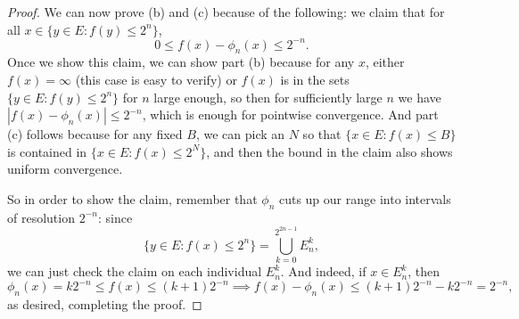 \begin{proof}
We can now prove (b) and (c) because of the following: we claim that for all $x \in \{y \in E: f(y) \le 2^n\}$,
\[
    0  \le f(x) - \phi_n(x) \le 2^{-n}. 
\]
Once we show this claim, we can show part (b) because for any $x$, either $f(x) = \infty$ (this case is easy to verify) or $f(x)$ is in the sets $\{y \in E: f(y) \le 2^n\}$ for $n$ large enough, so then for sufficiently large $n$ we have $|f(x) - \phi_n(x)| \le 2^{-n}$, which is enough for pointwise convergence. And part (c) follows because for any fixed $B$, we can pick an $N$ so that $\{x \in E: f(x) \le B\}$ is contained in $\{x \in E: f(x) \le 2^N\}$, and then the bound in the claim also shows uniform convergence. 

So in order to show the claim, remember that $\phi_n$ cuts up our range into intervals of resolution $2^{-n}$: since
\[
    \{y \in E: f(x) \le 2^n\} = \bigcup_{k=0}^{2^{2n-1}} E_n^k,
\]
we can just check the claim on each individual $E_n^k$. And indeed, if $x \in E_n^k$, then 
\[
    \phi_n(x) = k 2^{-n} \le f(x) \le (k+1) 2^{-n} \implies f(x) - \phi_n(x) \le (k+1)2^{-n} - k2^{-n} = 2^{-n},
\]
as desired, completing the proof. 
\end{proof}



